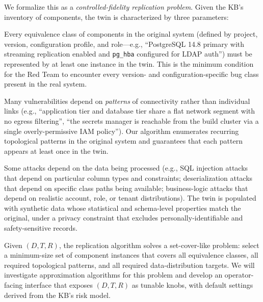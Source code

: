 We formalize this as a \emph{controlled-fidelity replication problem}.
Given the KB's inventory of components, the twin is characterized by
three parameters:

\begin{description}[leftmargin=1.6em,style=nextline,itemsep=0.15em,topsep=0.3em]
  \item[Diversity ($D$).] Every equivalence class of components in
  the original system (defined by project, version, configuration
  profile, and role---e.g., ``PostgreSQL 14.8 primary with
  streaming replication enabled and \texttt{pg\_hba} configured for
  LDAP auth'') must be represented by at least one instance in the
  twin. This is the minimum condition for the Red Team to encounter
  every version- and configuration-specific bug class present in the
  real system.
  \item[Topology representation ($T$).] Many vulnerabilities depend
  on \emph{patterns} of connectivity rather than individual links
  (e.g., ``application tier and database tier share a flat network
  segment with no egress filtering'', ``the secrets manager is
  reachable from the build cluster via a single overly-permissive
  IAM policy''). Our algorithm enumerates recurring
  topological patterns in the original system and guarantees that
  each pattern appears at least once in the twin.
  \item[Data representation ($R$).] Some attacks depend on the data
  being processed (e.g., SQL injection attacks that depend on
  particular column types and constraints; deserialization attacks
  that depend on specific class paths being available; business-logic
  attacks that depend on realistic account, role, or tenant
  distributions). The twin is populated with synthetic
  data whose statistical and schema-level properties match the
  original, under a privacy constraint that excludes
  personally-identifiable and safety-sensitive records.
\end{description}

Given $(D, T, R)$, the replication algorithm solves a set-cover-like
problem: select a minimum-size set of component instances that
covers all equivalence classes, all required topological patterns,
and all required data-distribution targets. We will investigate
approximation algorithms for this problem and develop an
operator-facing interface that exposes $(D, T, R)$ as tunable knobs,
with default settings derived from the KB's risk model.

